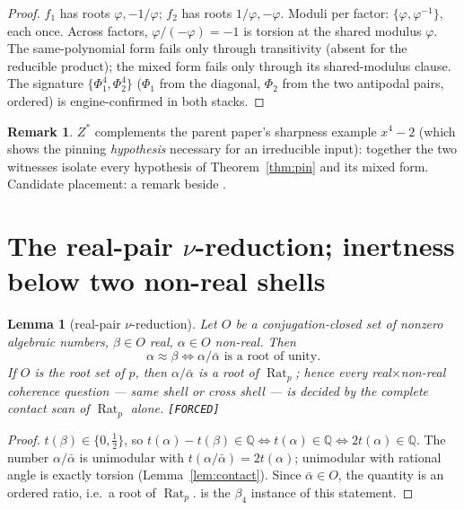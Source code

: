 \documentclass[11pt]{article}
\newcommand{\F}{\textnormal{\texttt{[FORCED]}}}
\newcommand{\Q}{\mathbb{Q}}
\newcommand{\Rat}{\operatorname{Rat}}
\newtheorem{lemma}[theorem]{Lemma}
\theoremstyle{definition}
\newtheorem{remark}[theorem]{Remark}
\begin{document}
\begin{proof}
$f_1$ has roots $\varphi,-1/\varphi$; $f_2$ has roots $1/\varphi,-\varphi$.
Moduli per factor: $\{\varphi,\varphi^{-1}\}$, each once. Across factors,
$\varphi/(-\varphi)=-1$ is torsion at the shared modulus $\varphi$. The
same-polynomial form fails only through transitivity (absent for the reducible
product); the mixed form fails only through its shared-modulus clause. The
signature $\{\Phi_1^4,\Phi_2^4\}$ ($\Phi_1$ from the diagonal, $\Phi_2$ from the
two antipodal pairs, ordered) is engine-confirmed in both stacks.
\end{proof}

\begin{remark}
$Z^{*}$ complements the parent paper's sharpness example $x^4-2$ (which shows
the pinning \emph{hypothesis} necessary for an irreducible input): together the
two witnesses isolate every hypothesis of Theorem~\ref{thm:pin} and its mixed
form. Candidate placement: a remark beside \cite[Ex.~7.19]{relcharge}.
\end{remark}

\section{The real-pair $\nu$-reduction; inertness below two non-real shells}
\label{sec:reduction}

\begin{lemma}[real-pair $\nu$-reduction]\label{lem:redu}
Let $O$ be a conjugation-closed set of nonzero algebraic numbers, $\beta\in O$
real, $\alpha\in O$ non-real. Then
\[
\alpha\approx\beta \iff \alpha/\bar\alpha \text{ is a root of unity.}
\]
If $O$ is the root set of $p$, then $\alpha/\bar\alpha$ is a \emph{root of
$\Rat_p$}; hence every real$\times$non-real coherence question --- same shell or
cross shell --- is decided by the complete contact scan of $\Rat_p$ alone. \F
\end{lemma}

\begin{proof}
$t(\beta)\in\{0,\tfrac12\}$, so $t(\alpha)-t(\beta)\in\Q\iff t(\alpha)\in\Q
\iff 2t(\alpha)\in\Q$. The number $\alpha/\bar\alpha$ is unimodular with
$t(\alpha/\bar\alpha)=2t(\alpha)$; unimodular with rational angle is exactly
torsion (Lemma~\ref{lem:contact}). Since $\bar\alpha\in O$, the quantity is an
ordered ratio, i.e.\ a root of $\Rat_p$. \cite[Ex.~7.17(iii)]{relcharge} is the
$\beta_4$ instance of this statement.
\end{proof}
\end{document}

